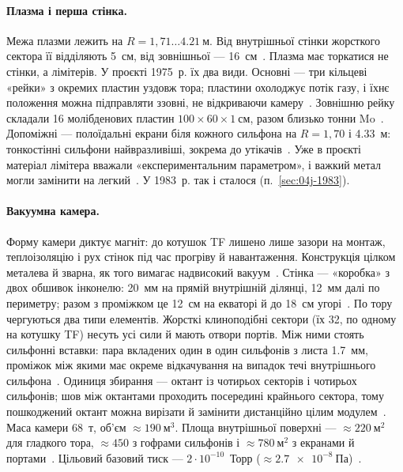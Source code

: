 \paragraph{Плазма і перша стінка.} Межа плазми лежить на $R=1{,}71\ldots\SI{4,21}{м}$. Від внутрішньої стінки жорсткого сектора її відділяють \SI{5}{см}, від зовнішньої --- \SI{16}{см}~\cite[с.~83]{JET1975}. Плазма має торкатися не стінки, а лімітерів. У проєкті 1975~р. їх два види. Основні --- три кільцеві «рейки» з окремих пластин уздовж тора; пластини охолоджує потік газу, і їхнє положення можна підправляти ззовні, не відкриваючи камеру~\cite[с.~301]{JET1975}. Зовнішню рейку складали 16 молібденових пластин $100\times60\times\SI{1}{см}$, разом близько тонни Mo~\cite[с.~314]{JET1975}. Допоміжні --- полоїдальні екрани біля кожного сильфона на $R=1{,}70$ і \SI{4,33}{м}: тонкостінні сильфони найвразливіші, зокрема до утікачів~\cite[с.~83, 301]{JET1975}. Уже в проєкті матеріал лімітера вважали «експериментальним параметром», і важкий метал могли замінити на легкий~\cite[с.~301, 315]{JET1975}. У 1983~р. так і сталося (п.~\ref{sec:04j-1983}).

\paragraph{Вакуумна камера.} Форму камери диктує магніт: до котушок TF лишено лише зазори на монтаж, теплоізоляцію і рух стінок під час прогріву й навантаження. Конструкція цілком металева й зварна, як того вимагає надвисокий вакуум~\cite[с.~295]{JET1975}. Стінка --- «коробка» з двох обшивок інконелю: 20~мм на прямій внутрішній ділянці, 12~мм далі по периметру; разом з проміжком це \SI{12}{см} на екваторі й до \SI{18}{см} угорі~\cite[с.~298, 310]{JET1975}. По тору чергуються два типи елементів. Жорсткі клиноподібні сектори (їх 32, по одному на котушку TF) несуть усі сили й мають отвори портів. Між ними стоять сильфонні вставки: пара вкладених один в один сильфонів з листа \SI{1,7}{мм}, проміжок між якими має окреме відкачування на випадок течі внутрішнього сильфона~\cite[с.~295, 306]{JET1975}. Одиниця збирання --- октант із чотирьох секторів і чотирьох сильфонів; шов між октантами проходить посередині крайнього сектора, тому пошкоджений октант можна вирізати й замінити дистанційно цілим модулем~\cite[с.~297, 299]{JET1975}. Маса камери \SI{68}{т}, об'єм $\approx\SI{190}{м^3}$. Площа внутрішньої поверхні --- $\approx\SI{220}{м^2}$ для гладкого тора, $\approx450$ з гофрами сильфонів і $\approx\SI{780}{м^2}$ з екранами й портами~\cite[с.~310]{JET1975}. Цільовий базовий тиск --- $2\cdot10^{-10}$~Торр ($\approx\SI{2,7e-8}{Па}$)~\cite[с.~315]{JET1975}.

